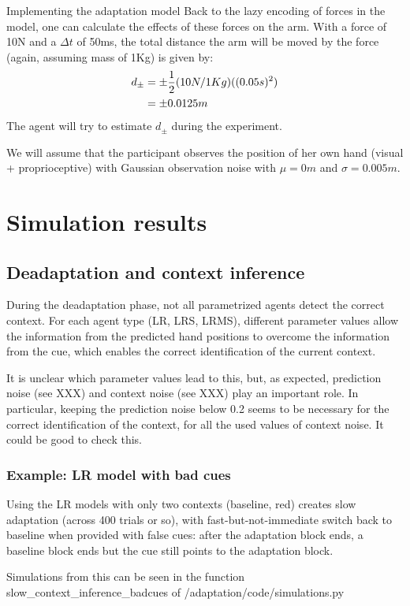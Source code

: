 \documentclass{report}
\begin{document}
\begin{chapter}{Implementing the adaptation model}
Back to the lazy encoding of forces in the model, one can calculate the effects
of these forces on the arm. With a force of 10N and a $\Delta t$ of 50ms, the
total distance the arm will be moved by the force (again, assuming mass of 1Kg)
is given by:
\begin{align}
  d_\pm &= \pm \frac{1}{2}(10N / 1Kg)((0.05s)^2)\\
               &= \pm 0.0125m
\end{align}
The agent will try to estimate $d_\pm$ during the experiment.

We will assume  that
the participant observes the position of her own hand (visual + proprioceptive)
with Gaussian observation noise with $\mu = 0m$ and $\sigma = 0.005m$.

\section{Simulation results}
\subsection{Deadaptation and context inference}
During the deadaptation phase, not all parametrized agents detect the correct
context. For each agent type (LR, LRS, LRMS), different parameter values allow
the information from the predicted hand positions to overcome the information
from the cue, which enables the correct identification of the current context.

It is unclear which parameter values lead to this, but, as expected, prediction
noise (see XXX) and context noise (see XXX) play an important role. In
particular, keeping the prediction noise below 0.2 seems to be necessary for
the correct identification of the context, for all the used values of context
noise. It could be good to check this.

\subsubsection{Example: LR model with bad cues}
Using the LR models with only two contexts (baseline, red) creates slow
adaptation (across 400 trials or so), with fast-but-not-immediate switch back
to baseline when provided with false cues: after the adaptation block ends, a
baseline block ends but the cue still points to the adaptation block.

Simulations from this can be seen in the function
slow\_context\_inference\_badcues of /adaptation/code/simulations.py


\end{chapter}
\end{document}
